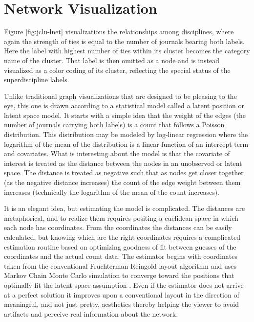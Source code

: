 \documentclass[]{book}
\theoremstyle{definition}
\theoremstyle{definition}
\theoremstyle{definition}
\theoremstyle{remark}
\begin{document}
\hypertarget{network-visualization}{%
\section{Network Visualization}\label{network-visualization}}

Figure \ref{fig:jclu-lnet} visualizations the relationships among
disciplines, where again the strength of ties is equal to the number of
journals bearing both labels. Here the label with highest number of ties
within its cluster becomes the category name of the cluster. That label
is then omitted as a node and is instead visualized as a color coding of
its cluster, reflecting the special status of the superdiscipline
labels.

Unlike traditional graph visualizations that are designed to be pleasing
to the eye, this one is drawn according to a statistical model called a
latent position or latent space model. It starts with a simple idea that
the weight of the edges (the number of journals carrying both labels) is
a count that follows a Poisson distribution. This distribution may be
modeled by log-linear regression where the logarithm of the mean of the
distribution is a linear function of an intercept term and covariates.
What is interesting about the model is that the covariate of interest is
treated as the distance between the nodes in an unobserved or latent
space. The distance is treated as negative such that as nodes get closer
together (as the negative distance increases) the count of the edge
weight between them increases (technically the logarithm of the mean of
the count increases).

It is an elegant idea, but estimating the model is complicated. The
distances are metaphorical, and to realize them requires positing a
euclidean space in which each node has coordinates. From the coordinates
the distances can be easily calculated, but knowing which are the right
coordinates requires a complicated estimation routine based on
optimizing goodness of fit between guesses of the coordinates and the
actual count data. The estimator begins with coordinates taken from the
conventional Fruchterman Reingold layout algorithm and uses Markov Chain
Monte Carlo simulation to converge toward the positions that optimally
fit the latent space assumption \citep[See][ for details of the model,
estimation, and software]{Krivitsky2008Fitting}. Even if the estimator
does not arrive at a perfect solution it improves upon a conventional
layout in the direction of meaningful, and not just pretty, aesthetics
thereby helping the viewer to avoid artifacts and perceive real
information about the network.
\end{document}
